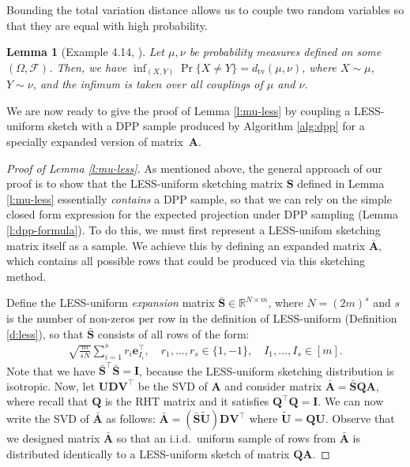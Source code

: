 \documentclass[11pt]{article}
\let\origtop\top
\renewcommand\top{{\scriptscriptstyle{\origtop}}}
\def\e{{\mathbf e}}
\def\A{{\mathbf A}}
\def\I{{\mathbf I}}
\def\Q{{\mathbf Q}}
\def\S{{\mathbf S}}
\def\D{{\mathbf D}}
\def\V{{\mathbf V}}
\def\R{{\mathbf R}}
\def\U{{\mathbf U}}
\def\R{{\mathds R}}
\newtheorem{lem}[thm]{Lemma}
\begin{document}
Bounding the total variation distance allows us to couple two random variables so that they are equal with high probability.

\begin{lem}[Example 4.14, \cite{v14}]
\label{lem:tv_distance}
Let $\mu, \nu$ be probability measures defined on some $(\Omega,\mathcal F)$. Then, we have $\inf_{(X,Y)}\Pr\{X\neq Y\} = d_{\mathrm{tv}}(\mu, \nu)$, where $X\sim\mu$, $Y\sim\nu$, and
the infimum is taken over all couplings of $\mu$ and $\nu$.
\end{lem}


We are now ready to give the proof of Lemma \ref{l:mu-less} by coupling a LESS-uniform sketch with a DPP sample produced by Algorithm \ref{alg:dpp} for a specially expanded version of matrix~$\A$.
\begin{proof}[Proof of Lemma \ref{l:mu-less}]
 As mentioned above, the general approach of our proof is to show that the LESS-uniform sketching matrix $\S$ defined in Lemma \ref{l:mu-less} essentially \emph{contains} a DPP sample, so that we can rely on the simple closed form expression for the expected projection under DPP sampling (Lemma \ref{l:dpp-formula}). To do this, we must first represent a LESS-unifom sketching matrix itself as a sample. We achieve this by defining an expanded matrix $\bar\A$, which contains all possible rows that could be produced via this sketching method.
  
  Define the LESS-uniform \emph{expansion}
  matrix $\bar\S\in\R^{N\times m}$, where $N=(2m)^s$ and $s$ is the number of non-zeros per row in the definition of LESS-uniform (Definition \ref{d:less}), so that $\bar\S$ consists of all
  rows of the form:
  \begin{align*}
\sqrt{\frac m{sN}}\sum_{i=1}^sr_{i}\e_{I_i}^\top, \quad
    r_1,...,r_s\in\{1,-1\},\quad I_1,...,I_s\in[m].
  \end{align*}
  Note that we have $\bar\S^\top\bar\S=\I$, because the LESS-uniform sketching distribution is isotropic. 
Now, let $\U\D\V^\top$ be the SVD of $\A$ and consider matrix $\bar\A
= \bar\S\Q\A$, where recall that $\Q$ is the RHT matrix and it satisfies $\Q^\top\Q=\I$. We can now write the SVD of $\bar\A$ as follows: $\bar\A=(\bar\S\tilde\U)\D\V^\top$ where $\tilde\U = \Q\U$. Observe that we designed matrix $\bar\A$ so that an i.i.d.~uniform sample of rows from $\bar\A$ is distributed identically to a LESS-uniform sketch of matrix $\Q\A$.


\end{proof}
\end{document}
